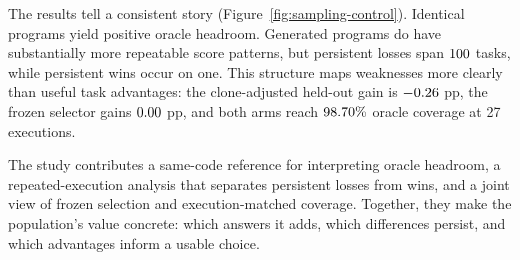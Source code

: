 The results tell a consistent story (Figure~\ref{fig:sampling-control}).
Identical programs yield positive
oracle headroom. Generated programs do have substantially more
repeatable score patterns, but persistent losses span
$100$ tasks, while persistent wins occur on one. This structure
maps weaknesses more clearly than useful task advantages: the
clone-adjusted held-out gain is $-0.26$ pp, the frozen selector gains
$0.00$ pp, and both arms reach
$98.70\%$ oracle coverage at 27 executions.

The study contributes a same-code reference for interpreting oracle
headroom, a repeated-execution analysis that separates persistent losses
from wins, and a joint view of frozen selection and execution-matched
coverage. Together, they make the population's value concrete: which
answers it adds, which differences persist, and which advantages inform
a usable choice.
